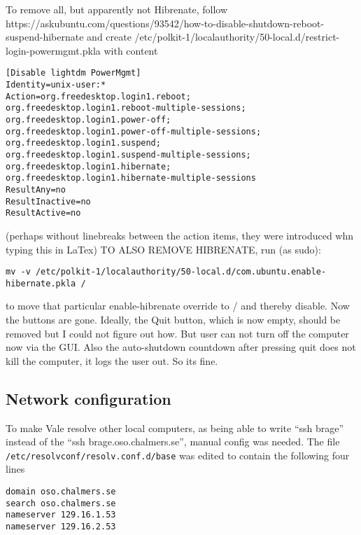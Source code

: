 To remove all, but apparently not Hibrenate, follow 
\newline
https://askubuntu.com/questions/93542/how-to-disable-shutdown-reboot-suspend-hibernate
and create
\newline
/etc/polkit-1/localauthority/50-local.d/restrict-login-powermgmt.pkla
with content
\begin{verbatim}
[Disable lightdm PowerMgmt]
Identity=unix-user:*
Action=org.freedesktop.login1.reboot;
org.freedesktop.login1.reboot-multiple-sessions;
org.freedesktop.login1.power-off;
org.freedesktop.login1.power-off-multiple-sessions;
org.freedesktop.login1.suspend;
org.freedesktop.login1.suspend-multiple-sessions;
org.freedesktop.login1.hibernate;
org.freedesktop.login1.hibernate-multiple-sessions
ResultAny=no
ResultInactive=no
ResultActive=no
\end{verbatim}
(perhaps without linebreaks between the action items, they were
introduced whn typing this in LaTex)
TO ALSO REMOVE HIBRENATE, run (as sudo):
\begin{verbatim}
mv -v /etc/polkit-1/localauthority/50-local.d/com.ubuntu.enable-hibernate.pkla /
\end{verbatim}
to move that particular enable-hibrenate override to / and thereby disable.
Now the buttons are gone. Ideally, the Quit button, which is now empty, should
be removed but I could not figure out how. But user can not turn off the
computer now via the GUI. Also the auto-shutdown countdown after pressing quit
does not kill the computer, it logs the user out. So its fine.

\subsection{Network configuration}
To make Vale resolve other local computers, as being able to write “ssh brage”
instead of the “ssh brage.oso.chalmers.se”, manual config was needed. The file
\verb!/etc/resolvconf/resolv.conf.d/base! was edited to contain the following four
lines
\begin{verbatim}
domain oso.chalmers.se
search oso.chalmers.se
nameserver 129.16.1.53
nameserver 129.16.2.53
\end{verbatim}

